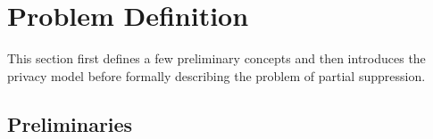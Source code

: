 \section{Problem Definition}
\label{sec:prob}

This section first defines a few preliminary concepts and then
introduces the privacy model before formally describing
the problem of partial suppression.

\subsection{Preliminaries}


